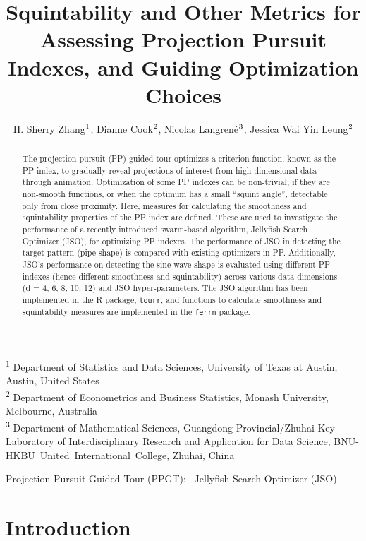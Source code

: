 \documentclass[
  12pt,
]{interact}
\title{Squintability and Other Metrics for Assessing Projection Pursuit
Indexes, and Guiding Optimization Choices}
\author{H. Sherry Zhang$\textsuperscript{1}$, Dianne
Cook$\textsuperscript{2}$, Nicolas
Langrené$\textsuperscript{3}$, Jessica Wai Yin
Leung$\textsuperscript{2}$}
\theoremstyle{plain}
\begin{document}
\captionsetup{labelsep=space}
\maketitle
\textsuperscript{1} Department of Statistics and Data
Sciences, University of Texas at Austin, Austin, United
States\\ \textsuperscript{2} Department of Econometrics and Business
Statistics, Monash
University, Melbourne, Australia\\ \textsuperscript{3} Department of
Mathematical Sciences, Guangdong Provincial/Zhuhai Key Laboratory of
Interdisciplinary Research and Application for Data Science,
BNU-HKBU~United~International~College, Zhuhai, China
\begin{abstract}
The projection pursuit (PP) guided tour optimizes a criterion function,
known as the PP index, to gradually reveal projections of interest from
high-dimensional data through animation. Optimization of some PP indexes
can be non-trivial, if they are non-smooth functions, or when the
optimum has a small ``squint angle'', detectable only from close
proximity. Here, measures for calculating the smoothness and
squintability properties of the PP index are defined. These are used to
investigate the performance of a recently introduced swarm-based
algorithm, Jellyfish Search Optimizer (JSO), for optimizing PP indexes.
The performance of JSO in detecting the target pattern (pipe shape) is
compared with existing optimizers in PP. Additionally, JSO's performance
on detecting the sine-wave shape is evaluated using different PP indexes
(hence different smoothness and squintability) across various data
dimensions (d = 4, 6, 8, 10, 12) and JSO hyper-parameters. The JSO
algorithm has been implemented in the R package, \texttt{tourr}, and
functions to calculate smoothness and squintability measures are
implemented in the \texttt{ferrn} package.
\end{abstract}
\begin{keywords}
\def\sep{;\ }
Projection Pursuit Guided Tour (PPGT)\sep 
Jellyfish Search Optimizer (JSO)
\end{keywords}


\section{Introduction}\label{introduction}
\end{document}
